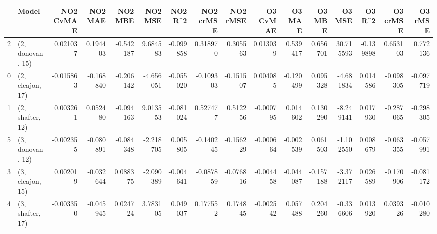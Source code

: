 \begin{tabular}{llrrrrrrrrrrrrrr}
\toprule
{} &             Model &  NO2 CvMAE &   NO2 MAE &   NO2 MBE &   NO2 MSE &   NO2 R\textasciicircum2 &  NO2 crMSE &  NO2 rMSE &  O3 CvMAE &    O3 MAE &    O3 MBE &     O3 MSE &    O3 R\textasciicircum2 &  O3 crMSE &   O3 rMSE \\
\midrule
2 &  (2, donovan, 15) &   0.021037 &  0.194403 & -0.542187 &  9.684583 & -0.099858 &   0.318970 &  0.305563 &  0.013039 &  0.539417 &  0.656701 &  30.715593 & -0.139898 &  0.653103 &  0.772136 \\
0 &  (2, elcajon, 17) &  -0.015863 & -0.168840 & -0.206142 & -4.656051 & -0.055020 &  -0.109303 & -0.151507 &  0.004085 & -0.120499 &  0.095328 &  -4.681834 &  0.014586 & -0.098305 & -0.097719 \\
1 &  (2, shafter, 12) &   0.003261 &  0.052480 & -0.094163 &  9.013553 & -0.081024 &   0.527477 &  0.512256 & -0.000795 &  0.014602 &  0.130290 &  -8.249141 &  0.017930 & -0.287065 & -0.298305 \\
5 &  (3, donovan, 12) &  -0.002355 & -0.080891 & -0.084348 & -2.218705 &  0.005805 &  -0.140245 & -0.156229 & -0.000664 & -0.002539 &  0.061503 &  -1.102550 &  0.008679 & -0.063355 & -0.057991 \\
3 &  (3, elcajon, 15) &   0.002019 & -0.032644 &  0.088375 & -2.090389 & -0.004641 &  -0.087859 & -0.076816 & -0.004458 & -0.044087 & -0.157188 &  -3.372117 &  0.026589 & -0.170906 & -0.081172 \\
4 &  (3, shafter, 17) &  -0.003350 & -0.045945 &  0.024724 &  3.783105 &  0.049037 &   0.177552 &  0.174845 & -0.002542 &  0.057488 &  0.204260 &  -0.336606 &  0.013920 &  0.039326 & -0.010280 \\
\bottomrule
\end{tabular}
